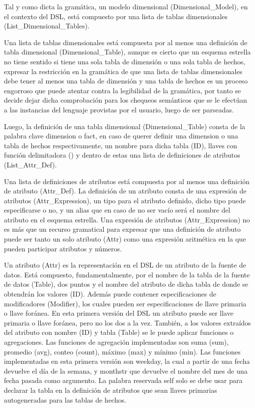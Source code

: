 
Tal y como dicta la gramática, un modelo dimensional (Dimensional\_Model), 
en el contexto del DSL, est\'a compuesto por una lista de tablas 
dimensionales (List\_Dimensional\_Tables). 

Una lista de tablas dimensionales est\'a compuesta por al menos una definici\'on de tabla dimensional 
(Dimensional\_Table), aunque es cierto que un esquema estrella no tiene sentido si tiene una sola tabla 
de dimensi\'on o una sola tabla de hechos, expresar la restricci\'on en la gramática de que una lista de 
tablas dimensionales debe tener al menos una tabla de dimensi\'on y una tabla de hechos es un proceso 
engorroso que puede atentar contra la legibilidad de la gramática, por tanto se decide dejar dicha 
comprobaci\'on para los chequeos sem\'anticos que se le efect\'uan a las instancias del lenguaje provistas 
por el usuario, luego de ser parseadas. 

Luego, la 
definición de una tabla dimensional (Dimensional\_Table) consta de la palabra clave dimension o fact, 
en caso de querer definir una dimension o una tabla de hechos respectivamente, un nombre para dicha tabla 
(ID), llaves con funci\'on delimitadora ({}) y dentro de estas una lista de definiciones de atributos
(List\_Attr\_Def). 

Una lista de definiciones de atributos est\'a compuesta por al menos una definición de atributo (Attr\_Def). 
La definición de un atributo consta de una expresión de atributos (Attr\_Expression), un tipo para el atributo 
definido, dicho tipo puede especificarse o no, y un alias que en caso de no ser vacío ser\'a el nombre del 
atributo en el esquema estrella. Una expresión de atributos (Attr\_Expression) no es m\'as que 
un recurso gramatical para expresar que una definición de atributo puede ser tanto un solo atributo (Attr)
como una expresi\'on aritm\'etica en la que pueden participar atributos y n\'umeros. 

Un atributo (Attr) es la representaci\'on en el DSL de un atributo de la fuente de datos. Est\'a compuesto, 
fundamentalmente, 
por el nombre de la tabla de la fuente de datos (Table), dos puntos y el nombre del atributo de dicha tabla 
de donde se obtendr\'an los valores (ID). Adem\'as puede contener especificaciones de modificadores (Modifier), 
los cuales pueden ser especificaciones de llave primaria o llave for\'anea. En esta primera versi\'on del 
DSL un atributo puede ser llave primaria o llave for\'anea, pero no los dos a la vez. Tambi\'en, a los valores
extra\'idos del atributo con nombre (ID) y tabla (Table) se le puede aplicar funciones o agregaciones. Las 
funciones de agregaci\'on implementadas son suma (sum), promedio (avg), conteo (count), m\'aximo (max) y 
m\'inimo (min). Las funciones implementadas en esta primera versi\'on son weekday, la cual a partir de 
una fecha devuelve el d\'ia de la semana, y monthstr que devuelve el nombre del mes de una fecha pasada 
como argumento. La palabra reservada self solo se debe usar para declarar la tabla en la definición de atributos 
que sean llaves primarias autogeneradas para las tablas de hechos.

